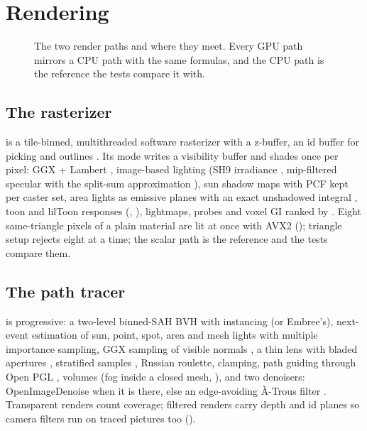 \chapter{Rendering}
\label{ch:rendering}

\begin{figure}[H]
  \centering
  \resizebox{\textwidth}{!}{}
  \caption{The two render paths and where they meet. Every GPU path mirrors a CPU path with the same formulas, and the CPU path is the reference the tests compare it with.}
  \label{fig:render}
\end{figure}

\section{The rasterizer}
 is a tile-binned, multithreaded software rasterizer with a z-buffer, an id buffer for picking and
outlines \cite{MarschnerShirley2021, Gregory2018vol2}. Its  mode writes a visibility buffer and shades
once per pixel: GGX + Lambert \cite{Cook1982Reflectance, Schlick1994Inexpensive}, image-based lighting (SH9 irradiance
\cite{Ramamoorthi2001Efficient}, mip-filtered specular with the split-sum approximation \cite{Karis2013Real,
Hill2012}), sun shadow maps with PCF kept per caster set, area lights as emissive planes with an exact unshadowed
integral \cite{Heitz2018Combining}, toon and lilToon responses (, ), lightmaps, probes and voxel GI
ranked by . Eight same-triangle pixels of a plain material are lit at once with AVX2 ();
triangle setup rejects eight at a time; the scalar path is the reference and the tests compare them.

\section{The path tracer}
 is progressive: a two-level binned-SAH BVH with instancing \cite{Wald2007Fast,
Moller1997Fast, Duff2017Building} (or Embree's), next-event estimation of sun, point, spot, area and mesh lights with
multiple importance sampling, GGX sampling of visible normals \cite{Heitz2018Sampling, Walter2007Microfacet}, a thin
lens with bladed apertures \cite{Shirley1997Low}, stratified samples \cite{Cranley1976Randomization}, Russian
roulette, clamping, path guiding through Open PGL \cite{Ruppert2020Robust}, volumes (fog inside a closed mesh,
), and two denoisers: OpenImageDenoise when it is there, else an edge-avoiding \`A-Trous filter
\cite{Dammertz2010Edge}. Transparent renders count coverage; filtered renders carry depth and id planes so camera
filters run on traced pictures too ().

